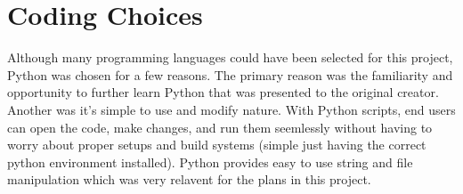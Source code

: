 \section{Coding Choices}

Although many programming languages could have been selected for this project, Python was chosen for a few reasons. The primary reason was the familiarity and opportunity to further learn Python that was presented to the original creator. Another was it's simple to use and modify nature. With Python scripts, end users can open the code, make changes, and run them seemlessly without having to worry about proper setups and build systems (simple just having the correct python environment installed). Python provides easy to use string and file manipulation which was very relavent for the plans in this project. 
